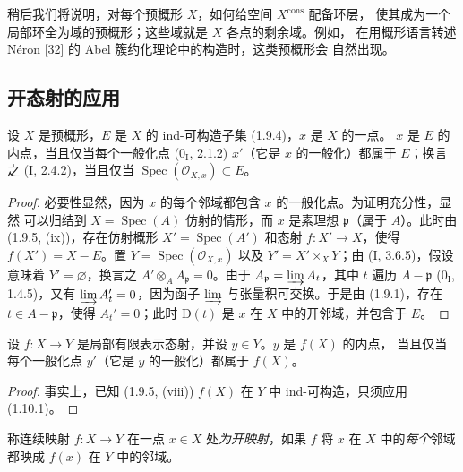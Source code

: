 \begin{env}[1.9.16]
\label{IV.1.9.16-fr}
稍后我们将说明，对每个预概形 $X$，如何给空间 $X^{\mathrm{cons}}$ 配备环层，
使其成为一个局部环全为域的预概形；这些域就是 $X$ 各点的剩余域。例如，
在用概形语言转述 Néron [32] 的 Abel 簇约化理论中的构造时，这类预概形会
自然出现。
\end{env}


\subsection{开态射的应用}
\label{subsection:IV.1.10-fr}

\begin{theorem}[1.10.1]
\label{IV.1.10.1-fr}
设 $X$ 是预概形，$E$ 是 $X$ 的 ind-可构造子集 (1.9.4)，$x$ 是 $X$ 的一点。
$x$ 是 $E$ 的内点，当且仅当每个一般化点 ($0_{\mathrm I}$, 2.1.2)
$x'$（它是 $x$ 的一般化）都属于 $E$；换言之 (I, 2.4.2)，当且仅当
$\operatorname{Spec}(\mathcal O_{X,x})\subset E$。
\end{theorem}

\begin{proof}
必要性显然，因为 $x$ 的每个邻域都包含 $x$ 的一般化点。为证明充分性，显然
可以归结到 $X=\operatorname{Spec}(A)$ 仿射的情形，而 $x$ 是素理想
$\mathfrak p$（属于 $A$）。此时由 (1.9.5, (ix))，存在仿射概形
$X'=\operatorname{Spec}(A')$ 和态射 $f:X'\to X$，使得
$f(X')=X-E$。置 $Y=\operatorname{Spec}(\mathcal O_{X,x})$ 以及
$Y'=X'\times_XY$；由 (I, 3.6.5)，假设意味着 $Y'=\varnothing$，换言之
$A'\otimes_AA_{\mathfrak p}=0$。由于
$A_{\mathfrak p}=\varinjlim A_t$，其中 $t$ 遍历 $A-\mathfrak p$
($0_{\mathrm I}$, 1.4.5)，又有 $\varinjlim A_t'=0$，因为函子
$\varinjlim$ 与张量积可交换。于是由 (1.9.1)，存在 $t\in A-\mathfrak p$，使得
$A_t'=0$；此时 $\mathrm D(t)$ 是 $x$ 在 $X$ 中的开邻域，并包含于 $E$。
\end{proof}

\begin{corollary}[1.10.2]
\label{IV.1.10.2-fr}
设 $f:X\to Y$ 是局部有限表示态射，并设 $y\in Y$。$y$ 是 $f(X)$ 的内点，
当且仅当每个一般化点 $y'$（它是 $y$ 的一般化）都属于 $f(X)$。
\end{corollary}

\begin{proof}
事实上，已知 (1.9.5, (viii)) $f(X)$ 在 $Y$ 中 ind-可构造，只须应用
(1.10.1)。
\end{proof}

称连续映射 $f:X\to Y$ 在一点 $x\in X$ 处\emph{为开映射}，如果 $f$ 将
$x$ 在 $X$ 中的\emph{每个}邻域都映成 $f(x)$ 在 $Y$ 中的邻域。

